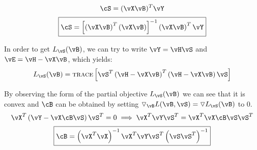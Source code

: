 \documentclass[a4paper,12pt]{article}
\begin{document}
\begin{mlsolution}
\begin{equation*}
    [(\vX\vB)^T(\vX\vB)]\cS = (\vX\vB)^T\vY
\end{equation*}
\begin{equation*}
    \boxed
    {
    \cS = \bs{\br{\vX\vB}^T\br{\vX\vB}}^{-1}\br{\vX\vB}^T\vY
    }
\end{equation*}

In order to get $L_{\vS}(\vB)$, we can try to write $\vY=\vH\vS$ and $\vE = \vH - \vX\vB$, which yields:
\begin{equation*}
    L_{\vS}(\vB) = \textsc{trace}\bs{\vS^T\br{\vH-\vX\vB}^T\br{\vH-\vX\vB}\vS}
\end{equation*}




By observing the form of the partial objective $L_{\vS}(\vB)$ we can see that it is convex and $\cB$ can be obtained by setting $\triangledown_{\vB}L(\vB, \vS) = \triangledown L_{\vS}(\vB)$ to $0$.
\begin{equation*}
    \vX^T\br{\vY - \vX\cB\vS}\vS^T = 0 \implies \vX^T\vY\vS^T = \vX^T\vX\cB\vS\vS^T
\end{equation*}
\begin{equation*}
    \boxed
    {
    \cB = \br{\vX^T\vX}^{-1}\vX^T\vY\vS^T\br{\vS\vS^T}^{-1}
    }
\end{equation*}


\end{mlsolution}
\end{document}
